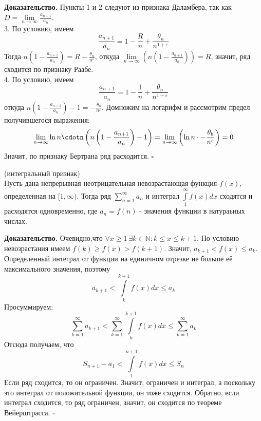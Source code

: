\textbf{Доказательство.} Пункты 1 и 2 следуют из признака Даламбера,
так как $D=\lim\limits_{n \to \infty}\frac{a_{n+1}}{a_n}$.\\
3. По условию, имеем
$$\frac{a_{n+1}}{a_n}=1-\frac{R}{n}+\frac{\theta_n}{n^{1+\varepsilon}}$$
Тогда $n(1-\frac{a_{n+1}}{a_n})=R-\frac{\theta_n}{n^\varepsilon}$, откуда
$\lim\limits_{n \to \infty}\left(n\left(1-\frac{a_{n+1}}{a_n}\right)\right)=R$,
значит, ряд сходится по признаку Раабе.\\
4. По условию, имеем
$$\frac{a_{n+1}}{a_n}=1-\frac{1}{n}+\frac{\theta_n}{n^{1+\varepsilon}}$$
откуда $n\left( 1-\frac{a_{n+1}}{a_n}\right)-1=
-\frac{\theta_b}{n^\varepsilon}$. Домножим на логарифм и рассмотрим предел
получившегося выражения:
$$\lim\limits_{n \to \infty}
\ln n\cdotn\left(n\left(1-\frac{a_{n+1}}{a_n}\right)-1\right)=
\lim\limits_{n \to \infty}\left(\ln n\cdot 
-\frac{\theta_b}{n^\varepsilon}\right)=0$$
Значит, по признаку Бертрана ряд расходится. $\square$ 
\begin{theor}
    (интегральный признак)\\
    Пусть дана непрерывная неотрицательная невозрастающая функция $f(x)$,
    определенная на $[1,\infty)$. Тогда 
    ряд $\sum\limits_{n=1}^{\infty} a_n$ и интеграл $\int\limits^\infty_1
    f(x)dx$ сходятся и расходятся одновременно, где $a_n=f(n)$ - значения
    функции в натураьных числах.
\end{theor}
\textbf{Доказательство.} Очевидно,что
$\forall x\geqslant1~\exists k\in\mathbb{N}:k\leqslant x\leqslant k+1$.
По условию невозрастания имеем $f(k)\geqslant f(x)>f(k+1)$.
Значит, $a_{k+1}<f(x)\leqslant a_k$. Определенный интеграл от функции 
на единичном отрезке не больше её максимального значения, поэтому
$$a_{k+1}<\int\limits_{k}^{k+1}f(x)dx\leqslant a_k$$ 
Просуммируем: 
$$\sum\limits_{k=1}^{\infty}a_{k+1}<\sum\limits_{k=1}^{\infty}
\int\limits_{k}^{k+1}f(x)dx \leqslant \sum\limits_{k=1}^{\infty} a_k$$
Отсюда получаем, что 
$$S_{n+1}-a_1<\int\limits_{1}^{n+1}f(x)dx\leqslant S_n$$ 
Если ряд сходится, то он ограничен. Значит, ограничен и интеграл, а поскольку
это интеграл от положительной функции, он тоже сходится. Обратно, если 
интеграл сходится, то ряд ограничен, значит, он сходится по теореме 
Вейерштрасса. $\square$


